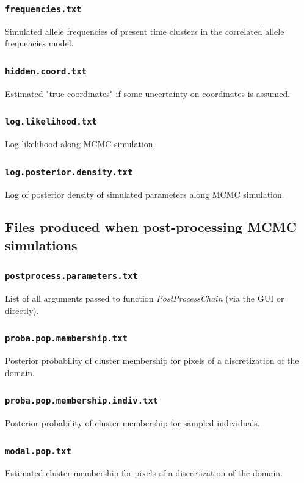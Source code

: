 \documentclass[a4paper,10pt]{article}
\begin{document}
\subsubsection{\texttt{frequencies.txt}}
Simulated allele frequencies of present time clusters in the correlated allele frequencies model. 


\subsubsection{\texttt{hidden.coord.txt}}
Estimated "true coordinates" if some uncertainty on coordinates is assumed.

\subsubsection{\texttt{log.likelihood.txt}}
Log-likelihood along MCMC simulation.


\subsubsection{\texttt{log.posterior.density.txt}}
Log of posterior density of simulated parameters along MCMC simulation.

\subsection{Files produced when post-processing MCMC simulations}

\subsubsection{\texttt{postprocess.parameters.txt}}
List of all arguments passed to function {\it PostProcessChain} (via the GUI or directly).

\subsubsection{\texttt{proba.pop.membership.txt}}
Posterior probability of cluster membership for pixels of a discretization of the domain.

\subsubsection{\texttt{proba.pop.membership.indiv.txt }}\label{sec:proba.pop.membership.indiv.txt}
Posterior probability of cluster membership for sampled individuals.


\subsubsection{\texttt{modal.pop.txt }}
Estimated cluster membership for pixels of a discretization of the domain.
\end{document}
